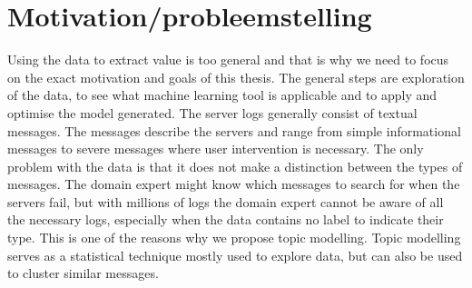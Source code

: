 \begin{comment}
--todo--
The intention of this research started with analysing e system logs to help create a model for predicting hardware and software failure for maintenance and automatic self-healing. The huge amount of system logs available from a variety of systems brought the question how to analyse and make use of the logs to predict hardware and software failure.

Current research of big data makes this a suitable problem to solve through recent machine learning techniques. 
During the time spent on this research challenges were met and identified for realising this goal and ended with the usage of Natural Language Processing (NLP) and unsupervised learning.  The untapped amount of raw data makes it possible for many more application, but in further paragraphs it will be made clear why NLP was chosen and what more could be applied on this Big data problem.

\end{comment}
 
\section{Motivation/probleemstelling}\label{introduction:Motivation}
Using the data to extract value is too general and that is why we need to focus on the exact motivation and goals of this thesis. The general steps are exploration of the data, to see what machine learning tool is applicable and to apply and optimise the model generated. The server logs generally consist of textual messages. The messages describe the servers and range from simple informational messages to severe messages where user intervention is necessary. The only problem with the data is that it does not make a distinction between the types of messages. The domain expert might know which messages to search for when the servers fail, but with millions of logs the domain expert cannot be aware of all the necessary logs, especially when the data contains no label to indicate their type. This is one of the reasons why we propose topic modelling. Topic modelling serves as a statistical technique mostly used to explore data, but can also be used to cluster similar messages.


\begin{comment}

Topic modelling is a hot topic in data science. System logs are used as source for the detection of problems in large computer systems. While domain experts can be used to detect and fix the problems detected, this can be difficult and time consuming. Machine learning techniques like topic modelling make it possible to develop models to extract these latent patterns from these system logs. While topic modelling is normally used in for large text corpera, recent research in the field of short text clustering and twitter tweets clustering are similar enough to by applicable for system logs. An interesting application which has not yet been touched a lot through unsupervised machine learning techniques.

\end{comment}

